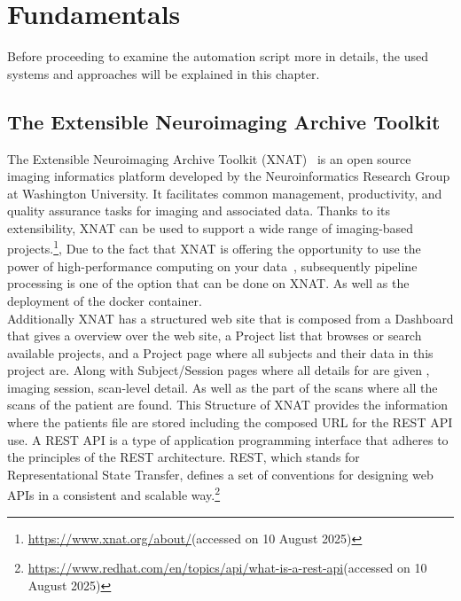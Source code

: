 \chapter{Fundamentals}

Before proceeding to examine the automation script more in details, the used systems and approaches will be explained in this chapter.

\section{The Extensible Neuroimaging Archive Toolkit}
The Extensible Neuroimaging Archive Toolkit (XNAT)~\cite{marcus_extensible_2007} is an open source imaging informatics platform developed by the Neuroinformatics Research Group at Washington University. It facilitates common management, productivity, and quality assurance tasks for imaging and associated data. Thanks to its extensibility, XNAT can be used to support a wide range of imaging-based projects.\footnote{\url{https://www.xnat.org/about/}(accessed on 10 August 2025)}, Due to the fact that XNAT is offering the opportunity to use the power of high-performance computing on your data~\cite{zaschke_extending_2024}, 
subsequently pipeline processing is one of the option that can be done on XNAT. As well as the deployment of the docker container.
\\
Additionally XNAT has a structured web site that is composed from a Dashboard that gives a overview over the web site, a Project list that browses or search available projects, and a Project page where all subjects and their data in this project are. Along with Subject/Session pages where all details for are given , imaging session, scan-level detail.
As well as the part of the scans where all the scans of the patient are found. 
This Structure of XNAT provides the information where the patients file are stored including the composed URL for the REST API use. A REST API is a type of application programming interface that adheres to the principles of the REST architecture. REST, which stands for Representational State Transfer, defines a set of conventions for designing web APIs in a consistent and scalable way.\footnote{\url{https://www.redhat.com/en/topics/api/what-is-a-rest-api}(accessed on 10 August 2025)}
\\
